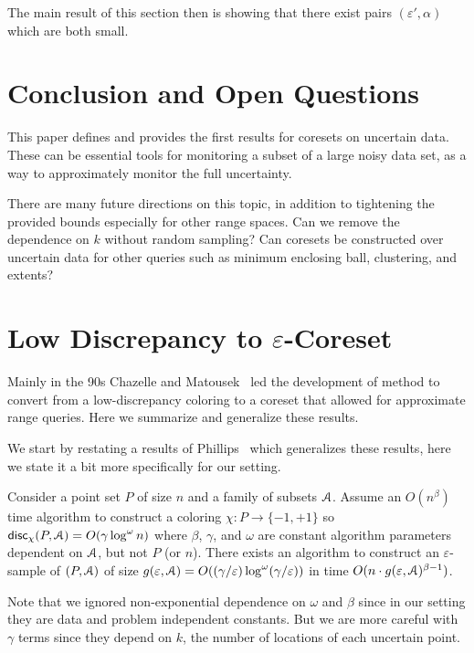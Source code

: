 \documentclass[11pt]{myclass}
\newcommand{\eps}{\varepsilon}
\newcommand{\Eu}[1]{\ensuremath{\EuScript{#1}}}
\newcommand{\disc}{\textsf{disc}}
\begin{document}
The main result of this section then is showing that there exist pairs $(\eps',\alpha)$ which are both small.  



\section{Conclusion and Open Questions}
This paper defines and provides the first results for coresets on uncertain data.  These can be essential tools for monitoring a subset of a large noisy data set, as a way to approximately monitor the full uncertainty.  

There are many future directions on this topic, in addition to tightening the provided bounds especially for other range spaces.  Can we remove the dependence on $k$ without random sampling?   Can coresets be constructed over uncertain data for other queries such as minimum enclosing ball, clustering, and extents?  

 


\appendix
\section{Low Discrepancy to $\eps$-Coreset}
\label{app:MR}

Mainly in the 90s Chazelle and Matousek~\cite{CW89,CM96,divide,Mat99,Cha01} led the development of method to convert from a low-discrepancy coloring to a coreset that allowed for approximate range queries.  Here we summarize and generalize these results.  


We start by restating a results of Phillips~\cite{Phi08,Phi09} which generalizes these results, here we state it a bit more specifically for our setting.  

\begin{theorem}
Consider a point set $P$ of size $n$ and a family of subsets $\Eu{A}$.
Assume an $O(n^\beta)$ time algorithm to construct a coloring $\chi : P \to \{-1,+1\}$ so $\disc_\chi(P,\Eu{A}) = O(\gamma \log^\omega n)$ where $\beta$, $\gamma$, and $\omega$ are constant algorithm parameters dependent on $\Eu{A}$, but not $P$ (or $n$).  
There exists an algorithm to construct an $\eps$-sample of $(P,\Eu{A})$ of size $g(\eps,\Eu{A}) = O((\gamma/\eps) \log^\omega(\gamma/\eps))$ in time 
$O(n \cdot g(\eps,\Eu{A})^{\beta-1})$.  
\label{thm:disc2samp}
\end{theorem}

Note that we ignored non-exponential dependence on $\omega$ and $\beta$ since in our setting they are data and problem independent constants.  But we are more careful with $\gamma$ terms since they depend on $k$, the number of locations of each uncertain point.  
\end{document}
